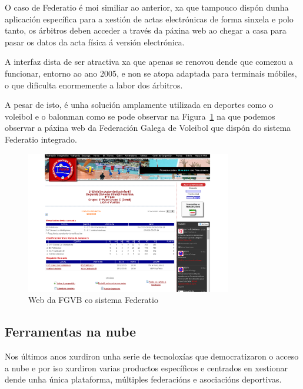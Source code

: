     O caso de Federatio é moi similiar ao anterior, xa que tampouco dispón 
dunha aplicación específica para a xestión de actas electrónicas de forma 
sinxela e polo tanto, os árbitros deben acceder a través da páxina web ao chegar 
a casa para pasar os datos da acta física á versión electrónica.

    A interfaz dista de ser atractiva xa que apenas se renovou dende que comezou a 
funcionar, entorno ao ano 2005, e non se atopa adaptada para terminais móbiles, 
o que dificulta enormemente a labor dos árbitros.

    A pesar de isto, é unha solución amplamente utilizada en deportes como o 
voleibol e o balonman como se pode observar na Figura~\ref{fig:img:federatio} 
na que podemos observar a páxina web da Federación Galega de Voleibol que 
dispón do sistema Federatio integrado.

      \begin{figure}[h!]
	\begin{center}
	  \includegraphics[width=0.8\textwidth]{./img/federatio-app.png}
	  \caption{Web da FGVB co sistema Federatio}
	  \label{fig:img:federatio}
	\end{center}
      \end{figure}

\clearpage


  \subsection{Ferramentas na nube}

  Nos últimos anos xurdiron unha serie de tecnoloxías que democratizaron o 
acceso a nube e por iso xurdiron varias productos específicos e centrados en 
xestionar dende unha única plataforma, múltiples federacións e asociacións 
deportivas.

